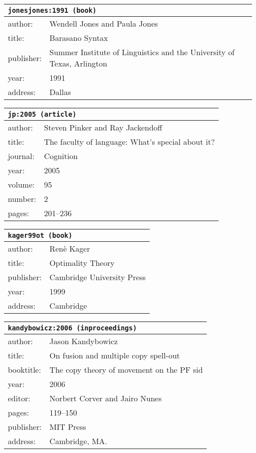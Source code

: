 \documentclass{article}
\begin{document}
\bigskip

\begin{tabular}{p{}p{}}
\multicolumn{2}{l}{\texttt{jonesjones:1991 (book)}}\\
\hline
author: & Wendell Jones and Paula Jones\\
title: & Barasano Syntax\\
publisher: & Summer Institute of Linguistics and the University of Texas, Arlington \\
year: & 1991\\
address: & Dallas\\
\end{tabular}

\bigskip

\begin{tabular}{p{}p{}}
\multicolumn{2}{l}{\texttt{jp:2005 (article)}}\\
\hline
author: & Steven Pinker and Ray Jackendoff\\
title: & The faculty of language: What's special about it?\\
journal: & Cognition\\
year: & 2005\\
volume: & 95\\
number: & 2\\
pages: & 201--236\\
\end{tabular}

\bigskip

\begin{tabular}{p{}p{}}
\multicolumn{2}{l}{\texttt{kager99ot (book)}}\\
\hline
author: & Ren{\`e} Kager\\
title: & Optimality Theory\\
publisher: & Cambridge University Press\\
year: & 1999\\
address: & Cambridge\\
\end{tabular}

\bigskip

\begin{tabular}{p{}p{}}
\multicolumn{2}{l}{\texttt{kandybowicz:2006 (inproceedings)}}\\
\hline
author: & Jason Kandybowicz\\
title: & On fusion and multiple copy spell-out\\
booktitle: & The copy theory of movement on the PF sid\\
year: & 2006\\
editor: & Norbert Corver and Jairo Nunes\\
pages: & 119--150\\
publisher: & MIT Press\\
address: & Cambridge, MA.\\
\end{tabular}
\end{document}
